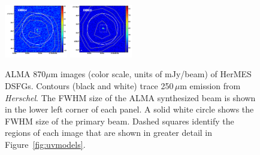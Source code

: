 \documentclass[iop]{emulateapj}
\begin{document}
\begin{figure}[!tbp]
\begin{centering}
\includegraphics[width=0.245\textwidth]{../Figures/overlays/XMM04_870_250.pdf}
\includegraphics[width=0.245\textwidth]{../Figures/overlays/XMM05_870_250.pdf}
\end{centering}

\caption{ ALMA 870$\mu$m images (color scale, units of mJy/beam) of HerMES
DSFGs.  Contours (black and white) trace 250$\,\mu$m emission from {\it
Herschel}.  The FWHM size of the ALMA synthesized beam is shown in the lower
left corner of each panel.  A solid white circle shows the FWHM size of the
primary beam.  Dashed squares identify the regions of each image that are shown
in greater detail in Figure~\ref{fig:uvmodels}.  \label{fig:imaging}}
\addtocounter{figure}{-1}

\end{figure}


%
%
\end{document}
